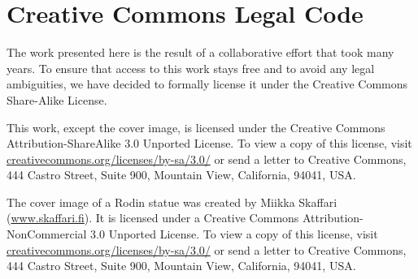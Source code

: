 \section{Creative Commons Legal Code}
\label{sec:cc}        

The work presented here is the result of a collaborative effort
that took many years.  To ensure that access to this work stays free
and to avoid any legal ambiguities, we have decided to formally license
it under the Creative Commons Share-Alike License.

This work, except the cover image, is licensed under the Creative Commons Attribution-ShareAlike 3.0 Unported License. To view a copy of this license, visit \href{http://creativecommons.org/licenses/by-sa/3.0/}{creative\-com\-mons.org/\-licenses/\-by-sa/3.0/} or send a letter to Creative Commons, 444 Castro Street, Suite 900, Mountain View, California, 94041, USA.

The cover image of a Rodin statue was created by Miikka Skaffari (\href{http://www.skaffari.fi/}{www.skaf\-fari.fi}).  It is licensed under a Creative Commons Attribution-NonCommercial 3.0 Unported License.  To view a copy of this license, visit \href{http://creativecommons.org/licenses/by-sa/3.0/}{creative\-com\-mons.org/\-licenses/\-by-sa/3.0/} or send a letter to Creative Commons, 444 Castro Street, Suite 900, Mountain View, California, 94041, USA.


